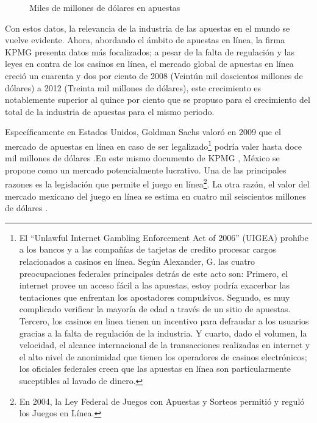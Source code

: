 \begin{figure}[!htb]\centering
   \begin {minipage}{0.85\textwidth}
     \caption{Miles de millones de dólares en apuestas}\label{Fig:gasto-apuestas}
   \end{minipage}
\end{figure}

Con estos datos, la relevancia de la industria de las apuestas en el mundo se vuelve evidente.  Ahora, abordando el ámbito de apuestas en línea, la firma KPMG \cite{kpmgOnlineGaming} presenta datos más focalizados; a pesar de la falta de regulación y las leyes en contra de los casinos en línea, el mercado global de apuestas en línea creció un cuarenta y dos por ciento de 2008 (Veintún mil doscientos millones de dólares) a 2012 (Treinta mil millones de dólares), este crecimiento es notablemente superior al quince por ciento que se propuso para el crecimiento del total de la industria de apuestas para el mismo periodo.

Específicamente en Estados Unidos, Goldman Sachs valoró en 2009 que el mercado de apuestas en línea en caso de ser legalizado\footnote{El ``Unlawful Internet Gambling Enforcement Act of 2006'' (UIGEA)  prohíbe a los bancos y a las compañías de tarjetas de credito procesar cargos relacionados a casinos en línea. Según Alexander, G. \cite{alexander2008us} las cuatro preocupaciones federales principales detrás de este acto son: Primero, el internet provee un acceso fácil a las apuestas, estoy podría exacerbar las tentaciones que enfrentan los apostadores compulsivos. Segundo, es muy complicado verificar la mayoría de edad a través de un sitio de apuestas. Tercero, los casinos en linea tienen un incentivo para defraudar a los usuarios gracias a la falta de regulación de la industria. Y cuarto, dado el volumen, la velocidad, el alcance internacional de la transacciones realizadas en internet y el alto nivel de anonimidad que tienen los operadores de casinos electrónicos; los oficiales federales creen que las apuestas en línea son particularmente suceptibles al lavado de dinero.} podría valer hasta doce mil millones de dólares \cite{goldmanParty}.En este mismo documento de KPMG \cite{kpmgOnlineGaming}, México se propone como un mercado potencialmente lucrativo. Una de las principales razones es la legislación que permite el juego en línea\footnote{En 2004, la Ley Federal de Juegos con Apuestas y Sorteos permitió y reguló los Juegos en Línea.}. La otra razón, el valor del mercado mexicano del juego en línea se estima en cuatro mil seiscientos millones de dólares \cite{yogonet}.

